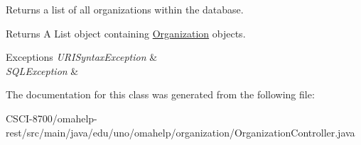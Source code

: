 Returns a list of all organizations within the database.

\begin{DoxyReturn}{Returns}
A List object containing \mbox{\hyperlink{classedu_1_1uno_1_1omahelp_1_1organization_1_1_organization}{Organization}} objects. 
\end{DoxyReturn}

\begin{DoxyExceptions}{Exceptions}
{\em U\+R\+I\+Syntax\+Exception} & \\
\hline
{\em S\+Q\+L\+Exception} & \\
\hline
\end{DoxyExceptions}


The documentation for this class was generated from the following file\+:\begin{DoxyCompactItemize}
\item 
C\+S\+C\+I-\/8700/omahelp-\/rest/src/main/java/edu/uno/omahelp/organization/Organization\+Controller.\+java\end{DoxyCompactItemize}
